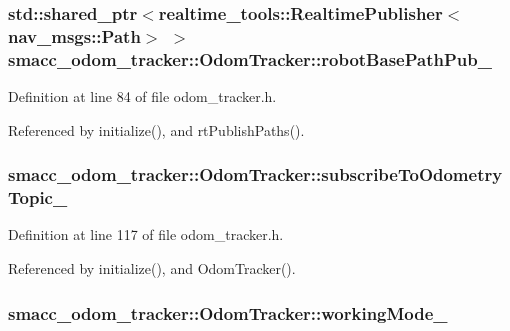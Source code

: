 \subsubsection[{\texorpdfstring{robot\+Base\+Path\+Pub\+\_\+}{robotBasePathPub_}}]{\setlength{\rightskip}{0pt plus 5cm}std\+::shared\+\_\+ptr$<$realtime\+\_\+tools\+::\+Realtime\+Publisher$<$nav\+\_\+msgs\+::\+Path$>$ $>$ smacc\+\_\+odom\+\_\+tracker\+::\+Odom\+Tracker\+::robot\+Base\+Path\+Pub\+\_\+\hspace{0.3cm}{\ttfamily [protected]}}\hypertarget{classsmacc__odom__tracker_1_1OdomTracker_a32d060919f2630e0695ce016c0563a3f}{}\label{classsmacc__odom__tracker_1_1OdomTracker_a32d060919f2630e0695ce016c0563a3f}


Definition at line 84 of file odom\+\_\+tracker.\+h.



Referenced by initialize(), and rt\+Publish\+Paths().

\subsubsection[{\texorpdfstring{subscribe\+To\+Odometry\+Topic\+\_\+}{subscribeToOdometryTopic_}}]{ smacc\+\_\+odom\+\_\+tracker\+::\+Odom\+Tracker\+::subscribe\+To\+Odometry\+Topic\+\_\+\hspace{0.3cm}{\ttfamily [protected]}}\hypertarget{classsmacc__odom__tracker_1_1OdomTracker_a394c4040c01f687c427d34c0ab50ba3e}{}\label{classsmacc__odom__tracker_1_1OdomTracker_a394c4040c01f687c427d34c0ab50ba3e}


Definition at line 117 of file odom\+\_\+tracker.\+h.



Referenced by initialize(), and Odom\+Tracker().

\subsubsection[{\texorpdfstring{working\+Mode\+\_\+}{workingMode_}}]{ smacc\+\_\+odom\+\_\+tracker\+::\+Odom\+Tracker\+::working\+Mode\+\_\+\hspace{0.3cm}{\ttfamily [protected]}}\hypertarget{classsmacc__odom__tracker_1_1OdomTracker_ad011432ae35a533fd61bae43179c3c36}{}\label{classsmacc__odom__tracker_1_1OdomTracker_ad011432ae35a533fd61bae43179c3c36}


